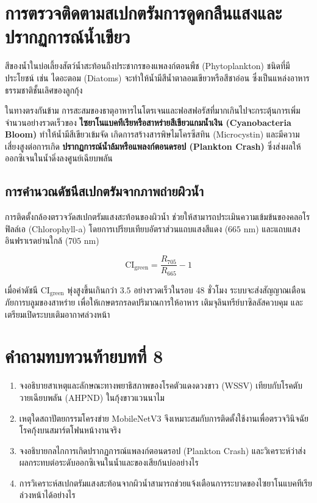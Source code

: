 \section{การตรวจติดตามสเปกตรัมการดูดกลืนแสงและปรากฏการณ์น้ำเขียว}

สีของน้ำในบ่อเลี้ยงสัตว์น้ำสะท้อนถึงประชากรของแพลงก์ตอนพืช (Phytoplankton) ชนิดที่มีประโยชน์ เช่น ไดอะตอม (Diatoms) จะทำให้น้ำมีสีน้ำตาลอมเขียวหรือสีชาอ่อน ซึ่งเป็นแหล่งอาหารธรรมชาติชั้นเลิศของลูกกุ้ง

ในทางตรงกันข้าม การสะสมของธาตุอาหารไนโตรเจนและฟอสฟอรัสที่มากเกินไปจะกระตุ้นการเพิ่มจำนวนอย่างรวดเร็วของ \textbf{ไซยาโนแบคทีเรียหรือสาหร่ายสีเขียวแกมน้ำเงิน (Cyanobacteria Bloom)} ทำให้น้ำมีสีเขียวเข้มจัด เกิดการสร้างสารพิษไมโครซีสทิน (Microcystin) และมีความเสี่ยงสูงต่อการเกิด \textbf{ปรากฏการณ์น้ำล้มหรือแพลงก์ตอนดรอป (Plankton Crash)} ซึ่งส่งผลให้ออกซิเจนในน้ำดิ่งลงศูนย์เฉียบพลัน

\subsection{การคำนวณดัชนีสเปกตรัมจากภาพถ่ายผิวน้ำ}

การติดตั้งกล้องตรวจวัดสเปกตรัมแสงสะท้อนของผิวน้ำ ช่วยให้สามารถประเมินความเข้มข้นของคลอโรฟิลล์เอ (Chlorophyll-a) โดยการเปรียบเทียบอัตราส่วนแถบแสงสีแดง ($665\text{ nm}$) และแถบแสงอินฟราเรดย่านใกล้ ($705\text{ nm}$)

\begin{equation}
\text{CI}_{\text{green}} = \frac{R_{705}}{R_{665}} - 1
\label{eq:chlorophyll_index}
\end{equation}

เมื่อค่าดัชนี $\text{CI}_{\text{green}}$ พุ่งสูงขึ้นเกินกว่า $3.5$ อย่างรวดเร็วในรอบ 48 ชั่วโมง ระบบจะส่งสัญญาณเตือนภัยการบลูมของสาหร่าย เพื่อให้เกษตรกรลดปริมาณการให้อาหาร เติมจุลินทรีย์บาซิลลัสควบคุม และเตรียมเปิดระบบเติมอากาศล่วงหน้า

\section*{คำถามทบทวนท้ายบทที่ 8}

\begin{enumerate}
    \item จงอธิบายสาเหตุและลักษณะทางพยาธิสภาพของโรคตัวแดงดวงขาว (WSSV) เทียบกับโรคตับวายเฉียบพลัน (AHPND) ในกุ้งขาวแวนนาไม
    \item เหตุใดสถาปัตยกรรมโครงข่าย MobileNetV3 จึงเหมาะสมกับการติดตั้งใช้งานเพื่อตรวจวินิจฉัยโรคกุ้งบนสมาร์ตโฟนหน้างานจริง
    \item จงอธิบายกลไกการเกิดปรากฏการณ์แพลงก์ตอนดรอป (Plankton Crash) และวิเคราะห์ว่าส่งผลกระทบต่อระดับออกซิเจนในน้ำและของเสียก้นบ่ออย่างไร
    \item การวิเคราะห์สเปกตรัมแสงสะท้อนจากผิวน้ำสามารถช่วยแจ้งเตือนการระบาดของไซยาโนแบคทีเรียล่วงหน้าได้อย่างไร
\end{enumerate}
\clearpage
